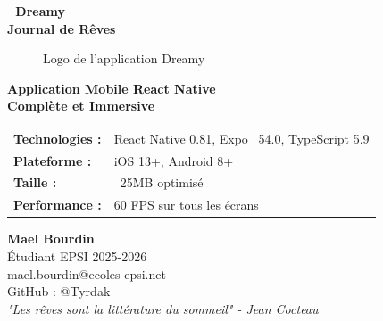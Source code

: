 \documentclass[12pt,a4paper]{article}
\begin{document}
\begin{titlepage}
    \centering
    \vspace*{2cm}
    
    {\Huge\bfseries\color{dreamnight} 🌙 Dreamy}\\[0.5cm]
    {\Large\bfseries Journal de Rêves}\\[2cm]
    
    \begin{figure}[H]
        \centering
        \caption{Logo de l'application Dreamy}
    \end{figure}
    
    \vspace{2cm}
    
    {\large\bfseries\color{dreampurple} Application Mobile React Native}\\[0.5cm]
    {\large\bfseries\color{dreampurple} Complète et Immersive}\\[2cm]
    
    \begin{tabular}{ll}
        \textbf{Technologies :} & React Native 0.81, Expo ~54.0, TypeScript 5.9 \\
        \textbf{Plateforme :} & iOS 13+, Android 8+ \\
        \textbf{Taille :} & ~25MB optimisé \\
        \textbf{Performance :} & 60 FPS sur tous les écrans \\
    \end{tabular}
    
    \vfill
    
    {\large\bfseries Mael Bourdin}\\[0.2cm]
    {\large Étudiant EPSI 2025-2026}\\[0.2cm]
    {\large mael.bourdin@ecoles-epsi.net}\\[0.2cm]
    {\large GitHub : @Tyrdak}\\[2cm]
    
    {\large\itshape "Les rêves sont la littérature du sommeil" - Jean Cocteau}
    
\end{titlepage}

\tableofcontents
\newpage
\end{document}
